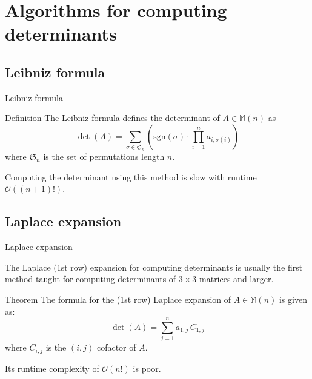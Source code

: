 \documentclass{beamer}
\begin{document}
\section{Algorithms for computing determinants}

\subsection{Leibniz formula}

\begin{frame}{Leibniz formula}

    \begin{block}{Definition}
        The Leibniz formula defines the determinant of $A \in \mathbb{M}(n)$ as
        \[
            \det(A) = \sum_{\sigma \in \mathfrak{S}_n}
            \left( \text{sgn}(\sigma) \cdot \prod_{i=1}^n a_{i,\sigma(i)} \right)
        \]
        where $\mathfrak{S}_n$ is the set of permutations length $n$.
    \end{block}

    Computing the determinant using this method is slow with runtime $\mathcal{O}((n+1)!)$.

\end{frame}

\subsection{Laplace expansion}

\begin{frame}{Laplace expansion}

    The Laplace (1st row) expansion for computing determinants is usually the first method taught
    for computing determinants of $3 \times 3$ matrices and larger.

    \begin{block}{Theorem}
        The formula for the (1st row) Laplace expansion of $A \in \mathbb{M}(n)$
        is given as:
        \[
            \det(A) = \sum_{j=1}^n a_{1,j}\, C_{1,j}
        \]
        where $C_{i,j}$ is the $(i, j)$ cofactor of $A$.
    \end{block}

    Its runtime complexity of $\mathcal{O}(n!)$ is poor.

\end{frame}
\end{document}
